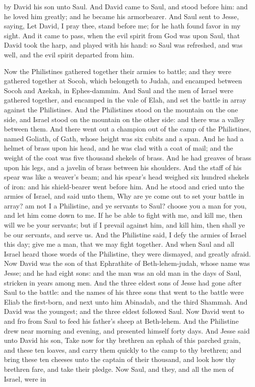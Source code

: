 by David his son unto Saul. And David came to Saul, and stood before him: and he loved him greatly; and he became his armorbearer. And Saul sent to Jesse, saying, Let David, I pray thee, stand before me; for he hath found favor in my sight. And it came to pass, when the evil spirit from God was upon Saul, that David took the harp, and played with his hand: so Saul was refreshed, and was well, and the evil spirit departed from him. 

Now the Philistines gathered together their armies to battle; and they were gathered together at Socoh, which belongeth to Judah, and encamped between Socoh and Azekah, in Ephes-dammim. And Saul and the men of Israel were gathered together, and encamped in the vale of Elah, and set the battle in array against the Philistines. And the Philistines stood on the mountain on the one side, and Israel stood on the mountain on the other side: and there was a valley between them. And there went out a champion out of the camp of the Philistines, named Goliath, of Gath, whose height was six cubits and a span. And he had a helmet of brass upon his head, and he was clad with a coat of mail; and the weight of the coat was five thousand shekels of brass. And he had greaves of brass upon his legs, and a javelin of brass between his shoulders. And the staff of his spear was like a weaver’s beam; and his spear’s head weighed six hundred shekels of iron: and his shield-bearer went before him. And he stood and cried unto the armies of Israel, and said unto them, Why are ye come out to set your battle in array? am not I a Philistine, and ye servants to Saul? choose you a man for you, and let him come down to me. If he be able to fight with me, and kill me, then will we be your servants; but if I prevail against him, and kill him, then shall ye be our servants, and serve us. And the Philistine said, I defy the armies of Israel this day; give me a man, that we may fight together. And when Saul and all Israel heard those words of the Philistine, they were dismayed, and greatly afraid.  Now David was the son of that Ephrathite of Beth-lehem-judah, whose name was Jesse; and he had eight sons: and the man was an old man in the days of Saul, stricken in years among men. And the three eldest sons of Jesse had gone after Saul to the battle: and the names of his three sons that went to the battle were Eliab the first-born, and next unto him Abinadab, and the third Shammah. And David was the youngest; and the three eldest followed Saul. Now David went to and fro from Saul to feed his father’s sheep at Beth-lehem. And the Philistine drew near morning and evening, and presented himself forty days.  And Jesse said unto David his son, Take now for thy brethren an ephah of this parched grain, and these ten loaves, and carry them quickly to the camp to thy brethren; and bring these ten cheeses unto the captain of their thousand, and look how thy brethren fare, and take their pledge. Now Saul, and they, and all the men of Israel, were in 